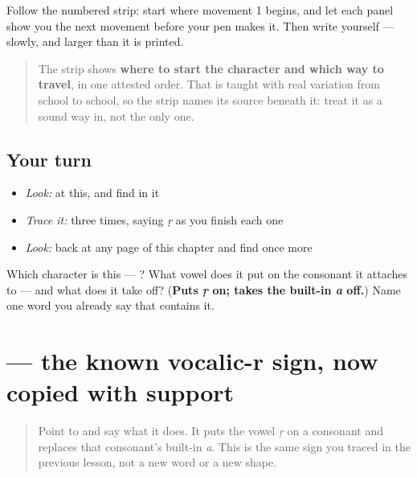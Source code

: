 Follow the numbered strip: start where movement 1 begins, and let each panel show you the next movement before your pen makes it. Then write  yourself — slowly, and larger than it is printed.

\begin{quote}
The strip shows \textbf{where to start the character and which way to travel}, in one attested order. That is taught with real variation from school to school, so the strip names its source beneath it: treat it as a sound way in, not the only one.
\end{quote}

\subsection*{Your turn}
\begin{itemize}
\raggedright
  \item \emph{Look:} at this, and find  in it
\end{itemize}

\begin{quote}
\end{quote}

\begin{itemize}
\raggedright
  \item \emph{Trace it:}  three times, saying \emph{ṛ} as you finish each one
  \item \emph{Look:} back at any page of this chapter and find  once more
\end{itemize}

\begin{tcolorbox}[breakable,colback=teal!4,colframe=teal!35!black,title={Before you move on}]
Which character is this — ? What vowel does it put on the consonant it attaches to — and what does it take off? (\textbf{Puts \emph{ṛ} on; takes the built-in \emph{a} off.}) Name one word you already say that contains it.
\end{tcolorbox}
\section[\texorpdfstring{\sk{ृ} (ṛ)}{ृ (ṛ)}]{ — the known vocalic-r sign, now copied with support}

\label{lesson:SA-W05-vocalic-r-guided-copy}



\begin{quote}
Point to \textbf{} and say what it does. It puts the vowel \emph{ṛ} on a consonant and replaces that consonant's built-in \emph{a}. This is the same sign you traced in the previous lesson, not a new word or a new shape.
\end{quote}

